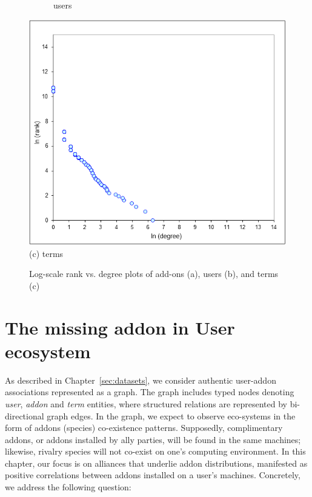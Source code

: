 \documentclass[11pt,oneside]{book}
\begin{document}
\begin{figure}[t]
\begin{subfigure}[b]{0.49\textwidth}
\caption{users}
\end{subfigure}
	\centering
\includegraphics[scale=0.48]{figures/zipf-terms.png} \\
(c) terms \\
\caption{Log-scale rank vs. degree plots of add-ons (a), users (b), and terms (c)}
	\label{fig:zipf}
\end{figure}

\chapter{The missing addon in User ecosystem}
\label{chap:user_ecosystem}

As described in Chapter~\ref{sec:datasets}, we consider authentic user-addon
associations represented as a graph. The graph includes typed nodes
denoting {\it user}, {\it addon} and {\it term} entities, where structured
relations are represented by bi-directional graph edges. In the graph, we expect to observe eco-systems in the form of addons (species) co-existence patterns. 
Supposedly, complimentary addons, or addons installed by ally parties, will be found in the same machines; likewise, rivalry species will not co-exist on one's computing environment. In this chapter, our focus is on alliances that underlie addon distributions, manifested as positive correlations between addons
installed on a user's machines. Concretely, we address the following question:
\end{document}
